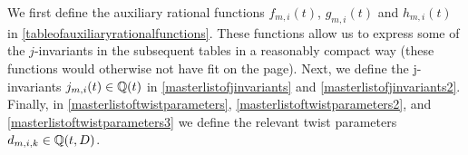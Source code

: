 We first define the auxiliary rational functions $f_{m,i}(t)$, $g_{m,i}(t)$ and $h_{m,i}(t)$ in \ref{tableofauxiliaryrationalfunctions}.  These functions allow us to express some of the $j$-invariants in the subsequent tables in a reasonably compact way (these functions would otherwise not have fit on the page). Next, we define the j-invariants $j_{m,i}(t) \in \mathbb{Q}(t)$ in \ref{masterlistofjinvariants} and \ref{masterlistofjinvariants2}. Finally, in \ref{masterlistoftwistparameters}, \ref{masterlistoftwistparameters2}, and \ref{masterlistoftwistparameters3} we define the relevant twist parameters $d_{m,i,k} \in \mathbb{Q}(t,D)$.







